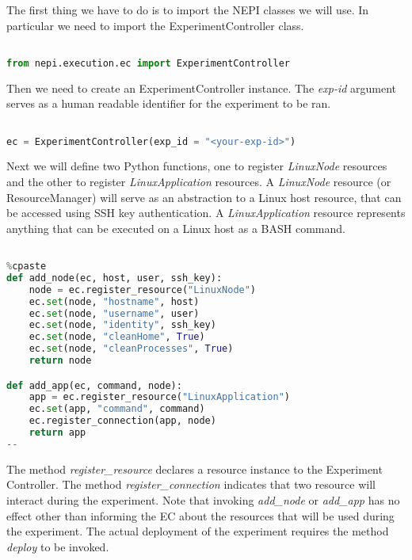 The first thing we have to do is to import the NEPI classes
we will use. 
In particular we need to import the ExperimentController class.

\begin{lstlisting}[language=Python]

from nepi.execution.ec import ExperimentController

\end{lstlisting}

Then we need to create an ExperimentController instance.
The \textit{exp-id} argument serves as a human readable identifier
for the experiment to be ran.

\begin{lstlisting}[language=Python]

ec = ExperimentController(exp_id = "<your-exp-id>")

\end{lstlisting}

Next we will define two Python functions, one to register \emph{LinuxNode}
resources and the other to register \emph{LinuxApplication} resources.
A \emph{LinuxNode} resource (or ResourceManager) will serve as an abstraction
to a Linux host resource, that can be accessed using SSH key authentication.
A \emph{LinuxApplication} resource represents anything that can be executed
on a Linux host as a BASH command.

\begin{lstlisting}[language=Python]

%cpaste
def add_node(ec, host, user, ssh_key):
    node = ec.register_resource("LinuxNode")
    ec.set(node, "hostname", host)
    ec.set(node, "username", user)
    ec.set(node, "identity", ssh_key)
    ec.set(node, "cleanHome", True)
    ec.set(node, "cleanProcesses", True)
    return node

def add_app(ec, command, node):
    app = ec.register_resource("LinuxApplication")
    ec.set(app, "command", command)
    ec.register_connection(app, node)
    return app
--

\end{lstlisting}

The method \textit{register\_resource} declares a resource instance to the 
Experiment Controller. The method \textit{register\_connection} indicates
that two resource will interact during the experiment. 
Note that invoking \textit{add\_node} or \textit{add\_app} has no effect other
than informing the EC about the resources that will be used during the experiment.
The actual deployment of the experiment requires the method \textit{deploy} to
be invoked.

